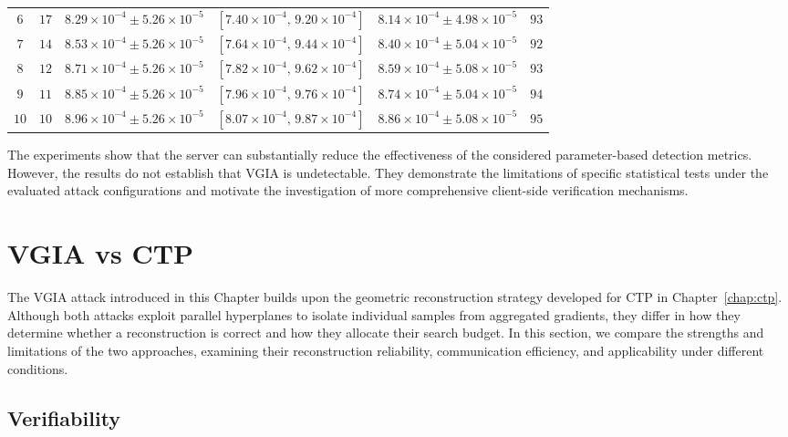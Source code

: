 \begin{table}[t]
{\begin{tabular}{cccccc}
$6$
& $17$
& $8.29\times10^{-4} \pm 5.26\times10^{-5}$
& $[7.40\times10^{-4},\,9.20\times10^{-4}]$
& $8.14\times10^{-4} \pm 4.98\times10^{-5}$
& $93$ \\

$7$
& $14$
& $8.53\times10^{-4} \pm 5.26\times10^{-5}$
& $[7.64\times10^{-4},\,9.44\times10^{-4}]$
& $8.40\times10^{-4} \pm 5.04\times10^{-5}$
& $92$ \\

$8$
& $12$
& $8.71\times10^{-4} \pm 5.26\times10^{-5}$
& $[7.82\times10^{-4},\,9.62\times10^{-4}]$
& $8.59\times10^{-4} \pm 5.08\times10^{-5}$
& $93$ \\

$9$
& $11$
& $8.85\times10^{-4} \pm 5.26\times10^{-5}$
& $[7.96\times10^{-4},\,9.76\times10^{-4}]$
& $8.74\times10^{-4} \pm 5.04\times10^{-5}$
& $94$ \\

$10$
& $10$
& $8.96\times10^{-4} \pm 5.26\times10^{-5}$
& $[8.07\times10^{-4},\,9.87\times10^{-4}]$
& $8.86\times10^{-4} \pm 5.08\times10^{-5}$
& $95$ \\
\bottomrule
\end{tabular}%
}
\end{table}

The experiments show that the server can substantially reduce the effectiveness of the considered parameter-based detection metrics. However, the results do not establish that VGIA is undetectable. They demonstrate the limitations of specific statistical tests under the evaluated attack configurations and motivate the investigation of more comprehensive client-side verification mechanisms.

\section{VGIA vs CTP}
The VGIA attack introduced in this Chapter builds upon the geometric reconstruction strategy developed for CTP in Chapter~\ref{chap:ctp}. Although both attacks exploit parallel hyperplanes to isolate individual samples from aggregated gradients, they differ in how they determine whether a reconstruction is correct and how they allocate their search budget. In this section, we compare the strengths and limitations of the two approaches, examining their reconstruction reliability, communication efficiency, and applicability under different conditions.

 \subsection{Verifiability}

